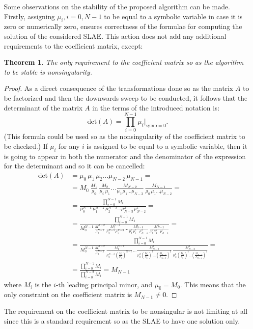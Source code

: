 \documentclass[11pt, a4paper]{article}
\newtheorem{theorem}{Theorem}
\begin{document}
Some observations on the stability of the proposed algorithm can be made.
Firstly, assigning $\mu_{i}, i=\overline{0, N-1}$ to be equal to a symbolic
variable in case it is zero or numerically zero, ensures correctness of the
formulae for computing the solution of the considered SLAE. This action does
not add any additional requirements to the coefficient matrix, except:
\begin{theorem}
The only requirement to the coefficient matrix so as the algorithm to be
stable is nonsingularity.
\end{theorem}
\begin{proof}
As a direct consequence of the transformations done so as the matrix $A$ to be
factorized and then the downwards sweep to be conducted, it follows that the
determinant of the matrix $A$ in the terms of the introduced notation is:
\begin{equation}
\label{eq_1}
\textrm{det}(A) = \prod_{i=0}^{N-1}\mu_{i}|_{\textrm{symb}=0}.
\end{equation}
(This formula could be used so as the nonsingularity of the coefficient matrix
to be checked.)
If $\mu_{i}$ for any $i$ is assigned to be equal to a symbolic variable, then
it is going to appear in both the numerator and the denominator of the
expression for the determinant and so it can be cancelled:
\begin{equation}
\begin{aligned}
\label{eq_2}
\textrm{det}(A)
&= \mu_{0}\,\mu_{1}\,\mu_{2}\ldots\mu_{N-2}\,\mu_{N-1} = \\
&= M_{0}\,\frac{M_{1}}{\mu_{0}}\,\frac{M_{2}}{\mu_{0}\,\mu_{1}}\ldots
\frac{M_{N-2}}{\mu_{0}\,\mu_{1}\ldots\mu_{N-3}}\,\frac{M_{N-1}}
{\mu_{0}\,\mu_{1}\ldots\mu_{N-2}} = \\
& = \frac{\prod_{i=0}^{N-1}M_{i}}{\mu_{0}^{N-1}\,\mu_{1}^{N-2}\,\mu_{2}^{N-3}
\ldots\mu_{N-3}^{2}\,\mu_{N-2}^{1}} = \\
& = \frac{\prod_{i=0}^{N-1}M_{i}}{M_{0}^{N-1}\,\frac{M_{1}^{N-2}}{\mu_{0}^{N-2}}\,
\frac{M_{2}^{N-3}}{\mu_{0}^{N-3}\,\mu_{1}^{N-3}}\ldots\frac{M_{N-3}^{2}}
{\mu_{0}^{2}\,\mu_{1}^{2}\ldots\mu_{N-4}^{2}}\,\frac{M_{N-2}^{1}}{\mu_{0}^{1}\,
\mu_{1}^{1}\ldots\mu_{N-3}^{1}}} = \\
& = \frac{\prod_{i=0}^{N-1}M_{i}}{M_{0}^{N-1}\,\frac{M_{1}^{N-2}}{\mu_{0}^{N-2}}\,
\frac{M_{2}^{N-3}}{\mu_{0}^{N-3}\,\left(\frac{M_{1}}{\mu_{0}}\right)^{N-3}}\ldots
\frac{M_{N-3}^{2}}
{\mu_{0}^{2}\,\left(\frac{M_{1}}{\mu_{0}}\right)^{2}\ldots
\left(\frac{M_{N-4}}{\mu_{N-3}}\right)^{2}}\,\frac{M_{N-2}^{1}}{\mu_{0}^{1}\,
\left(\frac{M_{1}}{\mu_{0}}\right)^{1}\ldots\left(\frac{M_{N-3}}{\mu_{N-4}}\right)^{1}}} = \\
& = \frac{\prod_{i=0}^{N-1}M_{i}}{\prod_{i=0}^{N-2}M_{i}} = M_{N-1}
\end{aligned}
\end{equation}
where $M_{i}$ is the $i$-th leading principal minor, and $\mu_{0} = M_{0}$.
This means that the only constraint on the coefficient matrix is $M_{N-1}\neq0$.
\end{proof}
The requirement on the coefficient matrix to be nonsingular is not limiting at
all since this is a standard requirement so as the SLAE to have one solution
only.
\end{document}
